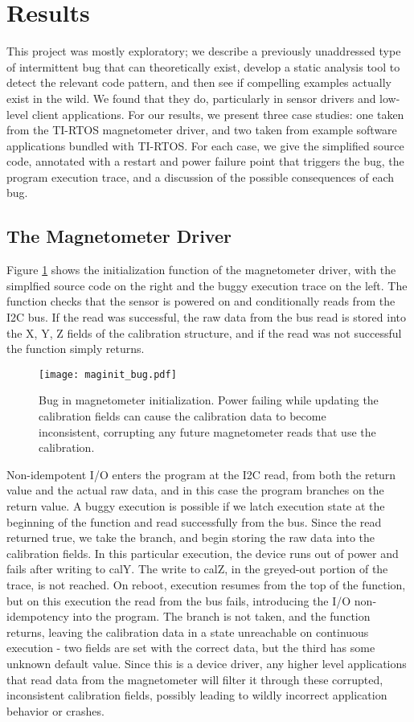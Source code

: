 \section{Results}
This project was mostly exploratory; we describe a previously unaddressed type
of intermittent bug that can theoretically exist, develop a static analysis tool
to detect the relevant code pattern, and then see if compelling examples
actually exist in the wild. We found that they do, particularly in sensor drivers and
low-level client applications. For our results, we present three case studies:
one taken from the TI-RTOS magnetometer driver, and two taken from example
software applications bundled with TI-RTOS. For each case, we give the
simplified source code, annotated with a restart and power failure point that
triggers the bug, the program execution trace, and a discussion of the possible
consequences of each bug.

\subsection{The Magnetometer Driver}

Figure \ref{fig:mag} shows the initialization function of the magnetometer driver, with the simplfied source code on the right and the buggy execution trace on the left. The function checks that the sensor is powered on and conditionally reads from the I2C bus. If the read was successful, the raw data from the bus read is stored into the X, Y, Z fields of the calibration structure, and if the read was not successful the function simply returns. 
\begin{figure}[h]
\centering
\texttt{[image: maginit\_bug.pdf]}
\caption{Bug in magnetometer initialization. Power failing while updating the calibration fields can cause the calibration data to become inconsistent, corrupting any future magnetometer reads that use the calibration.}
\label{fig:mag}
\end{figure}

Non-idempotent I/O enters the program at the I2C read, from both the return value and the actual raw data, and in this case the program branches on the return value. A buggy execution is possible if we latch execution state at the beginning of the function and read successfully from the bus. Since the read returned true, we take the branch, and begin storing the raw data into the calibration fields. In this particular execution, the device runs out of power and fails after writing to calY. The write to calZ, in the greyed-out portion of the trace, is not reached. On reboot, execution resumes from the top of the function, but on this execution the read from the bus fails, introducing the I/O non-idempotency into the program. The branch is not taken, and the function returns, leaving the calibration data in a state unreachable on continuous execution - two fields are set with the correct data, but the third has some unknown default value. 
Since this is a device driver, any higher level applications that read data from the magnetometer will filter it through these corrupted, inconsistent calibration fields, possibly leading to wildly incorrect application behavior or crashes.  

